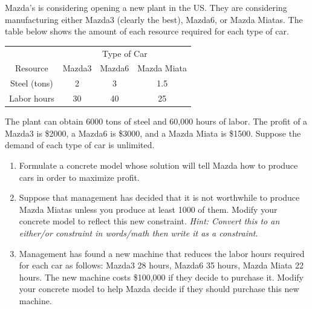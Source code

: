 \documentclass[11pt]{article}
\theoremstyle{definition}
\begin{document}
Mazda's is considering opening a new plant in the US. They are considering manufacturing either Mazda3 (clearly the best), Mazda6, or Mazda Miatas. The table below shows the amount of each resource required for each type of car.

\begin{center}
\begin{tabular}{|c|c|c|c|}
\hline
            & \multicolumn{3}{|c|}{Type of Car} \\
Resource    & Mazda3  & Mazda6 & Mazda Miata \\ \hline
Steel (tons)& 2       & 3      & 1.5 \\
Labor hours & 30      & 40     & 25 \\ \hline
\end{tabular}
\end{center}

The plant can obtain 6000 tons of steel and 60,000 hours of labor. The profit of a Mazda3 is \$2000, a Mazda6 is \$3000, and a Mazda Miata is \$1500. Suppose the demand of each type of car is unlimited.

\begin{enumerate}[resume]
\item Formulate a concrete model whose solution will tell Mazda how to produce cars in order to maximize profit.
\item Suppose that management has decided that it is not worthwhile to produce Mazda Miatas unless you produce at least 1000 of them.	Modify your concrete model to reflect this new constraint. \emph{Hint: Convert this to an either/or constraint in words/math then write it as a constraint}.
\item Management has found a new machine that reduces the labor hours required for each car as follows: Mazda3 28 hours, Mazda6 35 hours, Mazda Miata 22 hours. The new machine costs \$100,000 if they decide to purchase it. Modify your concrete model to help Mazda decide if they should purchase this new machine.
\end{enumerate}
\end{document}
